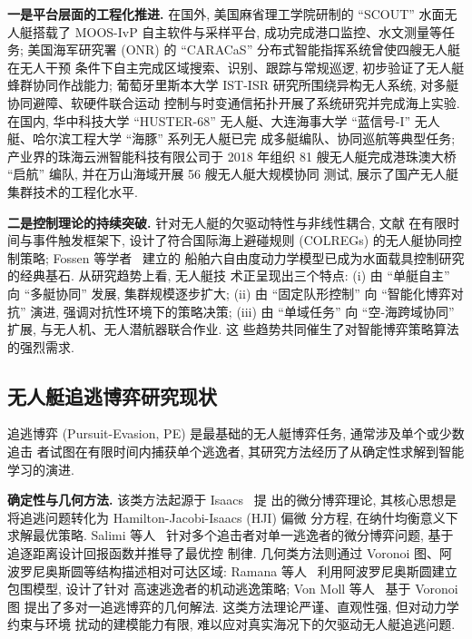\textbf{一是平台层面的工程化推进.} 在国外, 美国麻省理工学院研制的 ``SCOUT'' 水面无
人艇搭载了 MOOS-IvP 自主软件与采样平台, 成功完成港口监控、水文测量等任务;
美国海军研究署 (ONR) 的 ``CARACaS'' 分布式智能指挥系统曾使四艘无人艇在无人干预
条件下自主完成区域搜索、识别、跟踪与常规巡逻, 初步验证了无人艇蜂群协同作战能力;
葡萄牙里斯本大学 IST-ISR 研究所围绕异构无人系统, 对多艇协同避障、软硬件联合运动
控制与时变通信拓扑开展了系统研究并完成海上实验. 在国内, 华中科技大学 ``HUSTER-68''
无人艇、大连海事大学 ``蓝信号-I'' 无人艇、哈尔滨工程大学 ``海豚'' 系列无人艇已完
成多艇编队、协同巡航等典型任务; 产业界的珠海云洲智能科技有限公司于 2018 年组织
81 艘无人艇完成港珠澳大桥 ``启航'' 编队, 并在万山海域开展 56 艘无人艇大规模协同
测试, 展示了国产无人艇集群技术的工程化水平.

\textbf{二是控制理论的持续突破.} 针对无人艇的欠驱动特性与非线性耦合, 文献
\cite{zhang2023finite} 在有限时间与事件触发框架下, 设计了符合国际海上避碰规则
(COLREGs) 的无人艇协同控制策略; Fossen 等学者~\cite{fossen2011handbook} 建立的
船舶六自由度动力学模型已成为水面载具控制研究的经典基石. 从研究趋势上看, 无人艇技
术正呈现出三个特点: (i) 由 ``单艇自主'' 向 ``多艇协同'' 发展, 集群规模逐步扩大;
(ii) 由 ``固定队形控制'' 向 ``智能化博弈对抗'' 演进, 强调对抗性环境下的策略决策;
(iii) 由 ``单域任务'' 向 ``空-海跨域协同'' 扩展, 与无人机、无人潜航器联合作业. 这
些趋势共同催生了对智能博弈策略算法的强烈需求.

\subsection{无人艇追逃博弈研究现状}
\label{subsec:pe_review}
追逃博弈 (Pursuit-Evasion, PE) 是最基础的无人艇博弈任务, 通常涉及单个或少数追击
者试图在有限时间内捕获单个逃逸者, 其研究方法经历了从确定性求解到智能学习的演进.

\textbf{确定性与几何方法.} 该类方法起源于 Isaacs~\cite{isaacs1999differential} 提
出的微分博弈理论, 其核心思想是将追逃问题转化为 Hamilton-Jacobi-Isaacs (HJI) 偏微
分方程, 在纳什均衡意义下求解最优策略. Salimi 等人~\cite{salimi2019differential}
针对多个追击者对单一逃逸者的微分博弈问题, 基于追逐距离设计回报函数并推导了最优控
制律. 几何类方法则通过 Voronoi 图、阿波罗尼奥斯圆等结构描述相对可达区域:
Ramana 等人~\cite{ramana2017pursuit} 利用阿波罗尼奥斯圆建立包围模型, 设计了针对
高速逃逸者的机动逃逸策略; Von Moll 等人~\cite{vonmoll2019multi} 基于 Voronoi 图
提出了多对一追逃博弈的几何解法. 这类方法理论严谨、直观性强, 但对动力学约束与环境
扰动的建模能力有限, 难以应对真实海况下的欠驱动无人艇追逃问题.

